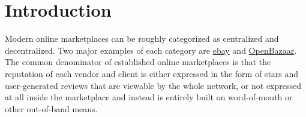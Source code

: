 \documentclass[11pt]{llncs}
\theoremstyle{definition}
\begin{document}
  \section{Introduction}
     Modern online marketplaces can be roughly categorized as centralized and decentralized.
     Two major examples of each category are \href{http://www.ebay.com}{ebay} and \href{https://openbazaar.org/}{OpenBazaar}.
     The common denominator of established online marketplaces is that the reputation of each vendor and client is either
     expressed in the form of stars and user-generated reviews that are viewable by the whole network, or not expressed at
     all inside the marketplace and instead is entirely built on word-of-mouth or other out-of-band means.
\end{document}
